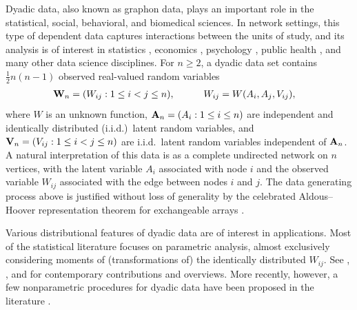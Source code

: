 Dyadic data, also known as graphon data, plays an important role in the
statistical, social, behavioral, and biomedical sciences. In network settings,
this type of dependent data captures interactions between the units of study,
and its analysis is of interest in statistics \citep{kolaczyk2009statistical},
economics \citep{graham2020network}, psychology \citep{kenny2020dyadic}, public
health \citep{luke2007network}, and many other data science disciplines. For
$n \geq 2$, a dyadic data set contains $\frac{1}{2}n(n-1)$ observed real-valued
random variables
%
\begin{align*}
  \mathbf{W}_n = (W_{i j}:1\leq i<j \leq n),
  \quad\qquad W_{i j}
  &= W(A_i,A_j,V_{i j}),
\end{align*}
%
where $W$ is an unknown function, $\mathbf{A}_n=(A_{i}:1\leq i \leq n)$ are
independent and identically distributed (i.i.d.)\ latent random variables, and
$\mathbf{V}_n=(V_{i j}:1\leq i<j \leq n)$ are i.i.d.\ latent random variables
independent of $\mathbf{A}_n$. A natural interpretation of this data is as a complete
undirected network on $n$ vertices, with the latent variable $A_i$ associated
with node $i$ and the observed variable $W_{i j}$ associated with the edge
between nodes $i$ and $j$. The data generating process above is justified
without loss of generality by the celebrated Aldous--Hoover representation
theorem for exchangeable arrays
\citep{aldous1981representations,hoover1979relations}.

Various distributional features of dyadic data are of interest in applications.
Most of the statistical literature focuses on parametric analysis, almost
exclusively considering moments of (transformations of) the identically
distributed $W_{i j}$. See \citet{davezies2021exchangeable},
\citet{gao2021minimax}, and \citet{matsushita2021jackknife} for
contemporary contributions and overviews. More recently, however, a few
nonparametric procedures for dyadic data have been proposed in the literature
\citep{graham2021minimax,graham2024kernel}.


